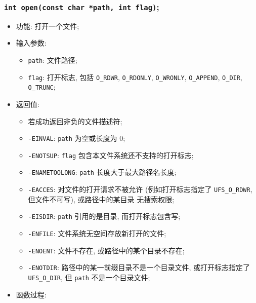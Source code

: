 \documentclass[nofonts, titlepage]{ctexart}
\begin{document}
  \subsubsection[\texttt{open}]{\texttt{int open(const char *path, int flag)};}
  \begin{itemize}
\item
  功能: 打开一个文件;
\item
  输入参数:

  \begin{itemize}
  \item
    \texttt{path}: 文件路径;
  \item
    \texttt{flag}: 打开标志, 包括 \texttt{O\_RDWR}, \texttt{O\_RDONLY},
    \texttt{O\_WRONLY}, \texttt{O\_APPEND}, \texttt{O\_DIR},
    \texttt{O\_TRUNC};
  \end{itemize}
\item
  返回值:

  \begin{itemize}
  \item
    若成功返回非负的文件描述符;
  \item
    \texttt{-EINVAL}: \texttt{path} 为空或长度为 0;
  \item
    \texttt{-ENOTSUP}: \texttt{flag} 包含本文件系统还不支持的打开标志;
  \item
    \texttt{-ENAMETOOLONG}: \texttt{path} 长度大于最大路径名长度;
  \item
    \texttt{-EACCES}: 对文件的打开请求不被允许 (例如打开标志指定了
    \texttt{UFS\_O\_RDWR}, 但文件不可写), 或路径中的某目录 无搜索权限;
  \item
    \texttt{-EISDIR}: \texttt{path} 引用的是目录, 而打开标志包含写;
  \item
    \texttt{-ENFILE}: 文件系统无空间存放新打开的文件;
  \item
    \texttt{-ENOENT}: 文件不存在, 或路径中的某个目录不存在;
  \item
    \texttt{-ENOTDIR}: 路径中的某一前缀目录不是一个目录文件,
    或打开标志指定了 \texttt{UFS\_O\_DIR}, 但 \texttt{path}
    不是一个目录文件;
  \end{itemize}
\item
  函数过程:


\end{itemize}
\end{document}
